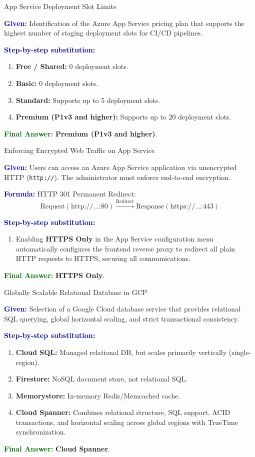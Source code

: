 \documentclass[11pt,a4paper,openany]{report}
\newcommand{\Given}{\par\textbf{\textcolor{navy}{Given:}} }
\newcommand{\Formula}{\par\textbf{\textcolor{navy}{Formula:}} }
\newcommand{\Steps}{\par\textbf{\textcolor{navy}{Step-by-step substitution:}}\par}
\newcommand{\Answer}{\par\textbf{\textcolor{darkgreen}{Final Answer:}} }
\begin{document}
\begin{solved}{App Service Deployment Slot Limits}
\Given Identification of the Azure App Service pricing plan that supports the highest number of staging deployment slots for CI/CD pipelines.
\Steps
\begin{enumerate}[leftmargin=*]
  \item \textbf{Free / Shared:} 0 deployment slots.
  \item \textbf{Basic:} 0 deployment slots.
  \item \textbf{Standard:} Supports up to 5 deployment slots.
  \item \textbf{Premium (P1v3 and higher):} Supports up to 20 deployment slots.
\end{enumerate}
\Answer \textbf{Premium (P1v3 and higher)}.
\end{solved}

\begin{solved}{Enforcing Encrypted Web Traffic on App Service}
\Given Users can access an Azure App Service application via unencrypted HTTP (\texttt{http://}). The administrator must enforce end-to-end encryption.
\Formula HTTP 301 Permanent Redirect:
\begin{equation}
\text{Request}(\text{http://...:80}) \xrightarrow{\text{Redirect}} \text{Response}(\text{https://...:443})
\end{equation}
\Steps
\begin{enumerate}[leftmargin=*]
  \item Enabling \textbf{HTTPS Only} in the App Service configuration menu automatically configures the frontend reverse proxy to redirect all plain HTTP requests to HTTPS, securing all communications.
\end{enumerate}
\Answer \textbf{HTTPS Only}.
\end{solved}

\begin{solved}{Globally Scalable Relational Database in GCP}
\Given Selection of a Google Cloud database service that provides relational SQL querying, global horizontal scaling, and strict transactional consistency.
\Steps
\begin{enumerate}[leftmargin=*]
  \item \textbf{Cloud SQL:} Managed relational DB, but scales primarily vertically (single-region).
  \item \textbf{Firestore:} NoSQL document store, not relational SQL.
  \item \textbf{Memorystore:} In-memory Redis/Memcached cache.
  \item \textbf{Cloud Spanner:} Combines relational structure, SQL support, ACID transactions, and horizontal scaling across global regions with TrueTime synchronization.
\end{enumerate}
\Answer \textbf{Cloud Spanner}.
\end{solved}
\end{document}

